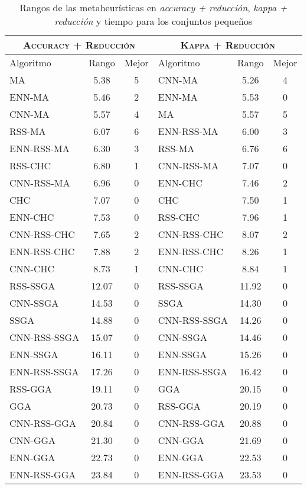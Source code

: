 \begin{table}[h!]
\centering
\begin{adjustbox}{max width =\textwidth}
\begin{tabular}{l c c|l c c}
\hline
\multicolumn{3}{c|}{\textsc{Accuracy + Reducción}}
	& \multicolumn{3}{c}{\textsc{Kappa + Reducción}} \\
\hline
Algoritmo & Rango & Mejor & Algoritmo & Rango & Mejor \\
\hline
\hline

MA           & 5.38  & 5 & CNN-MA       & 5.26  & 4  \\
ENN-MA       & 5.46  & 2 & ENN-MA       & 5.53  & 0 \\
CNN-MA       & 5.57  & 4 & MA           & 5.57  & 5 \\
RSS-MA       & 6.07  & 6 & ENN-RSS-MA   & 6.00  & 3 \\
ENN-RSS-MA   & 6.30  & 3 & RSS-MA       & 6.76  & 6 \\
RSS-CHC      & 6.80  & 1 & CNN-RSS-MA   & 7.07  & 0 \\
CNN-RSS-MA   & 6.96  & 0 & ENN-CHC      & 7.46  & 2 \\
CHC          & 7.07  & 0 & CHC          & 7.50  & 1 \\
ENN-CHC      & 7.53  & 0 & RSS-CHC      & 7.96  & 1 \\
CNN-RSS-CHC  & 7.65  & 2 & CNN-RSS-CHC  & 8.07  & 2 \\
ENN-RSS-CHC  & 7.88  & 2 & ENN-RSS-CHC  & 8.26  & 1  \\
CNN-CHC      & 8.73  & 1 & CNN-CHC      & 8.84  & 1  \\
RSS-SSGA     & 12.07 & 0 & RSS-SSGA     & 11.92 & 0  \\
CNN-SSGA     & 14.53 & 0 & SSGA         & 14.30 & 0  \\
SSGA         & 14.88 & 0 & CNN-RSS-SSGA & 14.26 & 0  \\
CNN-RSS-SSGA & 15.07 & 0 & CNN-SSGA     & 14.46 & 0  \\
ENN-SSGA     & 16.11 & 0 & ENN-SSGA     & 15.26 & 0  \\
ENN-RSS-SSGA & 17.26 & 0 & ENN-RSS-SSGA & 16.42 & 0  \\
RSS-GGA      & 19.11 & 0 & GGA          & 20.15 & 0  \\
GGA          & 20.73 & 0 & RSS-GGA      & 20.19 & 0  \\
CNN-RSS-GGA  & 20.84 & 0 & CNN-RSS-GGA  & 20.88 & 0  \\
CNN-GGA      & 21.30 & 0 & CNN-GGA      & 21.69 & 0  \\
ENN-GGA      & 22.73 & 0 & ENN-GGA      & 22.53 & 0  \\
ENN-RSS-GGA  & 23.84 & 0 & ENN-RSS-GGA  & 23.53 & 0  \\


\hline
\end{tabular}
\end{adjustbox}
\caption{Rangos de las metaheurísticas en \emph{accuracy + reducción}, \emph{kappa + reducción} y tiempo para los conjuntos pequeños}
\label{rank-peq}
\end{table} 

